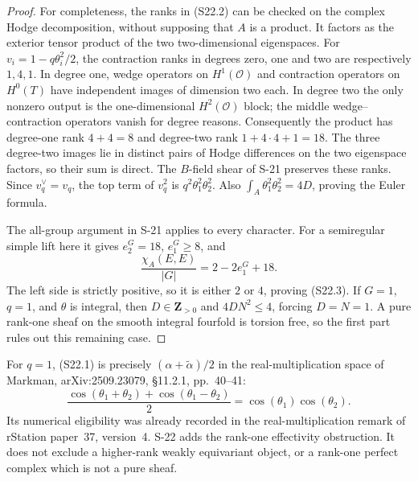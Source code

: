 \begin{proof}
For completeness, the ranks in (S22.2) can be checked on
the complex Hodge decomposition, without supposing that
$A$ is a product. It factors as the exterior tensor product
of the two two-dimensional eigenspaces. For
$v_i=1-q\theta_i^2/2$, the contraction ranks in degrees
zero, one and two are respectively $1,4,1$.
In degree one, wedge operators on $H^1(\mathcal O)$ and
contraction operators on $H^0(T)$ have independent images
of dimension two each. In degree two the only nonzero
output is the one-dimensional $H^2(\mathcal O)$ block;
the middle wedge--contraction operators vanish for degree
reasons. Consequently the product has degree-one rank
$4+4=8$ and degree-two rank $1+4\cdot4+1=18$.
The three degree-two images lie in distinct pairs of Hodge
differences on the two eigenspace factors, so their sum is
direct. The $B$-field shear of S-21 preserves these ranks.
Since $v_q^\vee=v_q$, the top term of $v_q^2$ is
$q^2\theta_1^2\theta_2^2$. Also
$\int_A\theta_1^2\theta_2^2=4D$, proving the Euler formula.

The all-group argument in S-21 applies to every character.
For a semiregular simple lift here it gives $e_2^G=18$,
$e_1^G\ge8$, and
\[
 \frac{\chi_A(E,E)}{|G|}=2-2e_1^G+18.
\]
The left side is strictly positive, so it is either $2$ or
$4$, proving (S22.3). If $G=1$, $q=1$, and $\theta$ is
integral, then $D\in\mathbf Z_{>0}$ and
$4DN^2\le4$, forcing $D=N=1$.
A pure rank-one sheaf on the smooth integral fourfold is
torsion free, so the first part rules out this remaining
case.
\end{proof}

For $q=1$, (S22.1) is precisely
$(\alpha+\widetilde\alpha)/2$ in the real-multiplication
space of Markman, arXiv:2509.23079, \S11.2.1, pp.~40--41:
\[
 \frac{\cos(\theta_1+\theta_2)+
             \cos(\theta_1-\theta_2)}2
       =\cos(\theta_1)\cos(\theta_2).
\]
Its numerical eligibility was already recorded in the
real-multiplication remark of rStation paper~37, version~4.
S-22 adds the rank-one effectivity obstruction. It does
not exclude a higher-rank weakly equivariant object, or a
rank-one perfect complex which is not a pure sheaf.

